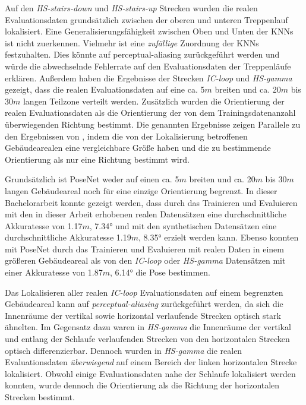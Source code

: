 Auf den \textit{HS-stairs-down} und \textit{HS-stairs-up} Strecken wurden die realen Evaluationsdaten grundsätzlich zwischen der oberen und unteren Treppenlauf lokalisiert. Eine Generalisierungsfähigkeit zwischen Oben und Unten der KNNs ist nicht zuerkennen. Vielmehr ist eine \textit{zufällige} Zuordnung der KNNs festzuhalten. Dies könnte auf perceptual-aliasing zurückgeführt werden und würde die abwechselnde Fehlerrate auf den Evaluationsdaten der Treppenläufe erklären.
Außerdem haben die Ergebnisse der Strecken \textit{IC-loop} und \textit{HS-gamma} gezeigt, dass die realen Evaluationsdaten auf eine ca. 5$m$ breiten und ca. 20$m$ bis 30$m$ langen Teilzone verteilt werden. Zusätzlich wurden die Orientierung der realen Evaluationsdaten als die Orientierung der von dem Trainingsdatenanzahl überwiegenden Richtung bestimmt. Die genannten Ergebnisse zeigen Parallele zu den Ergebnissen von \citet{acharyaBIMPoseNetIndoorCamera2019}, indem die von der Lokalisierung betroffenen Gebäudearealen eine vergleichbare Größe haben und die zu bestimmende Orientierung als nur eine Richtung bestimmt wird.

Grundsätzlich ist PoseNet weder auf einen ca. 5$m$ breiten und ca. 20$m$ bis 30$m$ langen Gebäudeareal noch für eine einzige Orientierung begrenzt. In dieser Bachelorarbeit konnte gezeigt werden, dass durch das Trainieren und Evaluieren mit den in dieser Arbeit erhobenen realen Datensätzen eine durchschnittliche Akkuratesse von 1.17$m$, 7.34° und mit den synthetischen Datensätzen eine durchschnittliche Akkuratesse 1.19$m$, 8.35° erzielt werden kann. Ebenso konnten \citet{walchImageBasedLocalizationUsing2017} mit PoseNet durch das Trainieren und Evaluieren mit realen Daten in einem größeren Gebäudeareal als von den \textit{IC-loop} oder \textit{HS-gamma} Datensätzen mit einer Akkuratesse von 1.87$m$, 6.14° die Pose bestimmen.


Das Lokalisieren aller realen \textit{IC-loop} Evaluationsdaten auf einem begrenzten Gebäudeareal kann auf \textit{perceptual-aliasing} zurückgeführt werden, da sich die Innenräume der vertikal sowie horizontal verlaufende Strecken optisch stark ähnelten. Im Gegensatz dazu waren in \textit{HS-gamma} die Innenräume der vertikal und entlang der Schlaufe verlaufenden Strecken von den horizontalen Strecken optisch differenzierbar. Dennoch wurden in \textit{HS-gamma} die realen Evaluationsdaten \textit{überwiegend} auf einem Bereich der linken horizontalen Strecke lokalisiert. Obwohl einige Evaluationsdaten nahe der Schlaufe lokalisiert werden konnten, wurde dennoch die Orientierung als die Richtung der horizontalen Strecken bestimmt.


